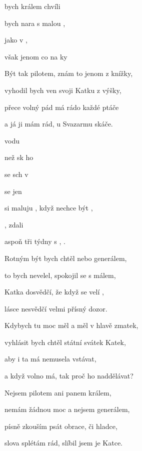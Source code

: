 

\zs
{} bych králem   chvíli  

 bych nara  s malou , 

 jako  v  , 

 však jenom  co  na ky   \ks

\zs
Být tak pilotem, znám to jenom z knížky,

vyhodil bych ven svoji Katku z výšky,

přece volný pád má rádo každé ptáče

a já ji mám rád, u Svazarmu skáče.
\ks

\zr
{} vodu  

 než sk ho   

 se sch v  

  se  jen   

 si maluju ,  když nechce být , 

, zdali   

 aspoň tři týdny s , .
\kr

\zs
Rotným být bych chtěl nebo generálem, 

to bych nevelel, spokojil se s málem, 

Katka dosvědčí, že když se velí , 

lásce nesvědčí velmi přísný dozor. 
\ks

\zs
Kdybych tu moc měl a měl v hlavě zmatek, 

vyhlásit bych chtěl státní svátek Katek, 

aby i ta má nemusela vstávat,

a když volno má, tak proč ho naddělávat? 
\ks

\zr     \kr

\zs
Nejsem pilotem ani panem králem, 

nemám žádnou moc a nejsem generálem, 

písně zkouším psát obrace, či hladce, 

slova splétám rád, slíbil jsem je Katce.
\ks

\kp
